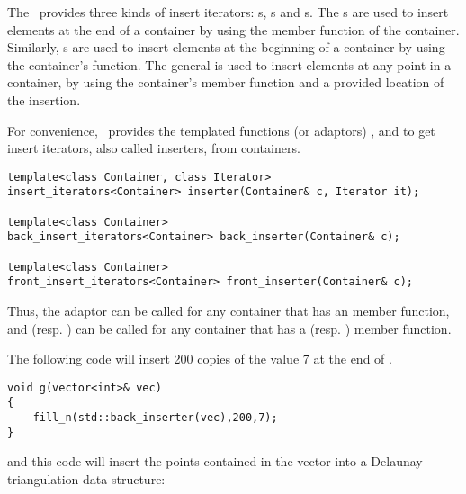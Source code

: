 The \stl\ provides three kinds of insert iterators: s,
s and s.
The s are used to insert elements at the end of 
a container by using the  member function of the container.
Similarly, s are used to insert elements at the
beginning of a container by using the container's 
function.  The general  is used to insert elements
at any point in a container, by using the container's  
member function and a provided location of the insertion.

For convenience, \stl\  provides the templated
functions (or adaptors) 
, 
and  to get insert iterators, also called inserters,
 from containers.

\begin{verbatim}
template<class Container, class Iterator> 
insert_iterators<Container> inserter(Container& c, Iterator it); 

template<class Container> 
back_insert_iterators<Container> back_inserter(Container& c); 

template<class Container> 
front_insert_iterators<Container> front_inserter(Container& c); 
\end{verbatim}

Thus, the  adaptor can be called for any container that
has an  member function, and 
(resp. ) can be called for any container that has a
 (resp. ) member function.

The following code will insert 200 copies of the value 7 at the end of
.
\begin{verbatim}
void g(vector<int>& vec)
{
    fill_n(std::back_inserter(vec),200,7);
}
\end{verbatim}
and this code will insert the points contained in the vector 
into a Delaunay triangulation data structure:

